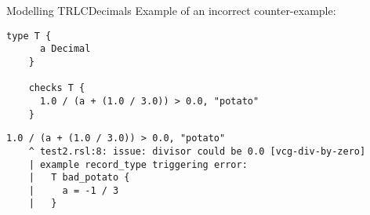 \documentclass[aspectratio=169]{beamer}
\begin{document}
\begin{frame}[fragile]{Modelling TRLC}{Decimals}
  Example of an incorrect counter-example:
  \begin{lstlisting}[language=TRLC,gobble=4]
    type T {
      a Decimal
    }

    checks T {
      1.0 / (a + (1.0 / 3.0)) > 0.0, "potato"
    }
  \end{lstlisting}
  \begin{scriptsize}
\begin{verbatim}
1.0 / (a + (1.0 / 3.0)) > 0.0, "potato"
    ^ test2.rsl:8: issue: divisor could be 0.0 [vcg-div-by-zero]
    | example record_type triggering error:
    |   T bad_potato {
    |     a = -1 / 3
    |   }
\end{verbatim}
  \end{scriptsize}
\end{frame}
\end{document}
